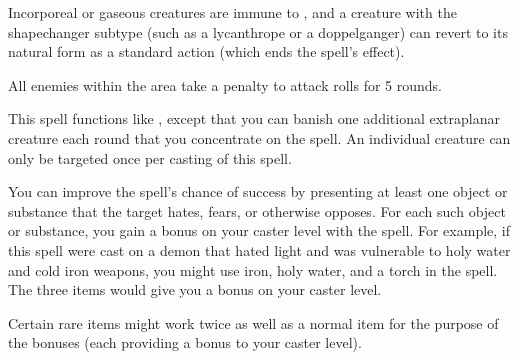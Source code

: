 \begin{spellnotes}
    Incorporeal or gaseous creatures are immune to , and a creature with the shapechanger subtype (such as a lycanthrope or a doppelganger) can revert to its natural form as a standard action (which ends the spell's effect). 
\end{spellnotes}

\begin{spelleffect}
  All enemies within the area take a  penalty to attack rolls for 5 rounds.
\end{spelleffect}

\spellrng{\rngmed}
\begin{spelleffect}
  This spell functions like , except that you can banish one additional extraplanar creature each round that you concentrate on the spell. An individual creature can only be targeted once per casting of this spell.
\end{spelleffect}
\begin{spellnotes}
  You can improve the spell's chance of success by presenting at least one object or substance that the target hates, fears, or otherwise opposes. For each such object or substance, you gain a  bonus on your caster level with the spell. For example, if this spell were cast on a demon that hated light and was vulnerable to holy water and cold iron weapons, you might use iron, holy water, and a torch in the spell. The three items would give you a  bonus on your caster level. 
  \par Certain rare items might work twice as well as a normal item for the purpose of the bonuses (each providing a  bonus to your caster level).
\end{spellnotes}


